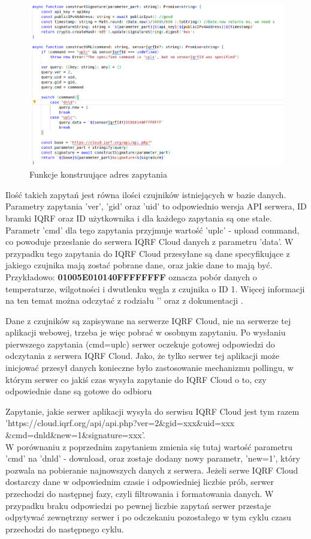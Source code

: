 \begin{figure}[H]
    \includegraphics[width=\textwidth]{zdj/app/construct-url.png}
    \caption{Funkcje konstruujące adres zapytania}
\end{figure}

Ilość takich zapytań jest równa ilości czujników istniejących
w bazie danych. Parametry zapytania 'ver', 'gid' oraz 'uid' to odpowiednio wersja API serwera, ID bramki IQRF oraz ID użytkownika i dla każdego zapytania są one 
stałe. Parametr 'cmd' dla tego zapytania przyjmuje wartość 'uplc' - upload command, co powoduje przesłanie do serwera IQRF Cloud danych z parametru 'data'.
W przypadku tego zapytania do IQRF Cloud przesyłane są dane specyfikujące z jakiego czujnika mają zostać pobrane dane, oraz jakie dane to mają być. 
Przykładowo: \textbf{01005E010140FFFFFFFF} oznacza pobór danych o temperaturze, wilgotności i dwutlenku węgla z czujnika o ID 1. Więcej informacji na ten temat 
można odczytać z rodziału '' oraz z dokumentacji \cite{protronix-comms}.

Dane z czujników są zapisywane na serwerze IQRF Cloud, nie na serwerze tej aplikacji webowej, trzeba je więc pobrać w osobnym zapytaniu. 
Po wysłaniu pierwszego zapytania (cmd=uplc) serwer oczekuje gotowej odpowiedzi do odczytania z serwera IQRF Cloud. Jako, że tylko serwer tej aplikacji może inicjować przesył danych
konieczne było zastosowanie mechanizmu pollingu, w którym serwer co jakiś czas wysyła zapytanie do IQRF Cloud o to, czy odpowiednie dane są gotowe do odbioru

Zapytanie, jakie serwer aplikacji wysyła do serwisu IQRF Cloud jest tym razem \\
'https://cloud.iqrf.org/api/api.php?ver=2\&gid=xxx\&uid=xxx\\\&cmd=dnld\&new=1\&signature=xxx'. \\ W porównaniu z poprzednim zapytaniem zmienia się tutaj wartość parametru
'cmd' na 'dnld' - download, oraz zostaje dodany nowy parametr, 'new=1', który pozwala na pobieranie najnowszych danych z serwera. Jeżeli serwe IQRF Cloud dostarczy dane
w odpowiednim czasie i odpowiedniej liczbie prób, serwer przechodzi do następnej fazy, czyli filtrowania i formatowania danych. W przypadku braku odpowiedzi po
pewnej liczbie zapytań serwer przestaje odpytywać zewnętrzny serwer i po odczekaniu pozostałego w tym cyklu czasu przechodzi do następnego cyklu.

